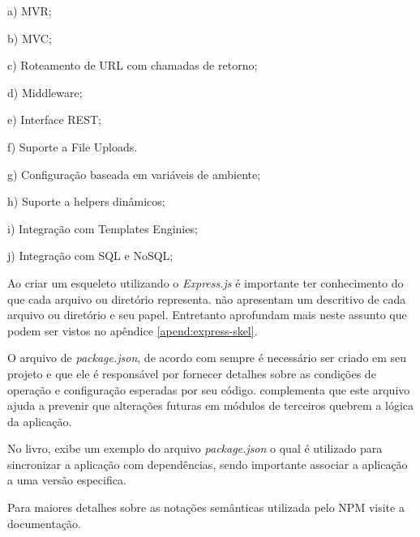   \begin{compactitem}
    \item[a)] \ac{MVR};   
    
    \item[b)] \ac{MVC};
    
    \item[c)] Roteamento de \ac{URL} com chamadas de retorno;
    
    \item[d)] Middleware;
    
    \item[e)] Interface \ac{REST};
    
    \item[f)] Suporte a File Uploads.
    
    \item[g)] Configuração baseada em variáveis de ambiente;
    
    \item[h)] Suporte a helpers dinâmicos;
    
    \item[i)] Integração com Templates Enginies;
    
    \item[j)] Integração com SQL e NoSQL;
    
  \end{compactitem}
  
  Ao criar um esqueleto utilizando o \textit{Express.js} é importante ter conhecimento do que cada
  arquivo ou diretório representa.  não apresentam um descritivo de cada arquivo 
  ou diretório e seu papel. Entretanto  aprofundam mais neste assunto que podem ser vistos
  no apêndice \ref{apend:express-skel}.
  
  O arquivo de \textit{package.json}, de acordo com  sempre é necessário ser criado 
  em seu projeto e que ele é responsável por fornecer detalhes sobre as condições de operação e configuração 
  esperadas por seu código.  complementa que este arquivo ajuda a prevenir que alterações 
  futuras em módulos de terceiros quebrem a lógica da aplicação.

  No livro,  exibe um exemplo do arquivo 
  \textit{package.json} o qual é utilizado para sincronizar a aplicação com dependências, sendo importante associar 
  a aplicação a uma versão especifica. 
  
  Para maiores detalhes sobre as notações semânticas utilizada pelo \ac{NPM} visite a documentação. \cite{Semver:2013}

